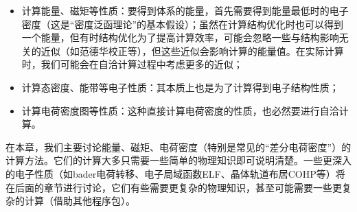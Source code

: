 \begin{itemize}
    \item 计算能量、磁矩等性质：要得到体系的能量，首先需要得到能量最低时的电子密度（这是“密度泛函理论”的基本假设）；虽然在计算结构优化时也可以得到一个能量，但有时结构优化为了提高计算效率，可能会忽略一些与结构影响无关的近似（如范德华校正等），但这些近似会影响计算的能量值。在实际计算时，我们可能会在自洽计算过程中考虑更多的近似；
    \item 计算态密度、能带等电子性质：其本质上也是为了计算得到电子结构性质；
    \item 计算电荷密度图等性质：这种直接计算电荷密度的性质，也必然要进行自洽计算。
\end{itemize}

在本章，我们主要讨论能量、磁矩、电荷密度（特别是常见的“差分电荷密度”）的计算方法。它们的计算大多只需要一些简单的物理知识即可说明清楚。一些更深入的电子性质（如bader电荷转移、电子局域函数ELF、晶体轨道布居COHP等）将在后面的章节进行讨论，它们有些需要更复杂的物理知识，甚至可能需要一些更复杂的计算（借助其他程序包）。